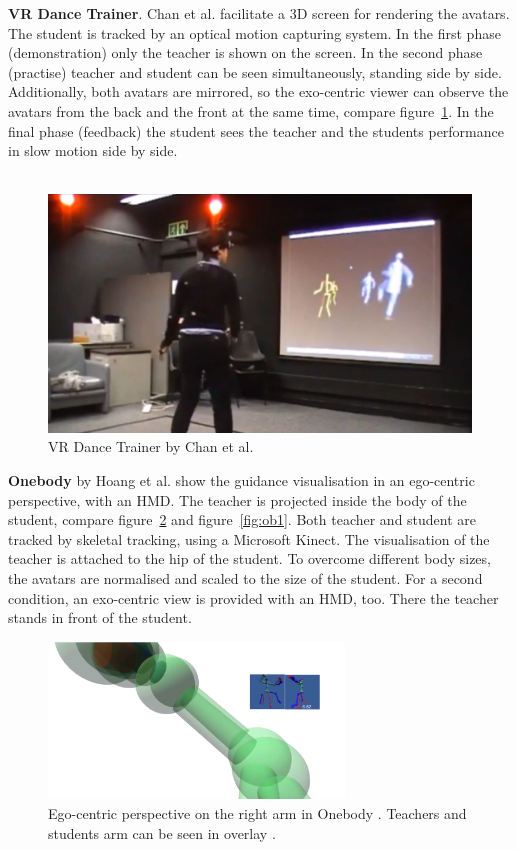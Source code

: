 \textbf{VR Dance Trainer}. Chan et al. \cite{Chan2010} facilitate a 3D screen for rendering the avatars. The student is tracked by an optical motion capturing system. In the first phase (demonstration) only the teacher is shown on the screen. In the second phase (practise) teacher and student can be seen simultaneously, standing side by side. Additionally, both avatars are mirrored, so the exo-centric viewer can observe the avatars from the back and the front at the same time, compare figure~\ref{fig:vrdtPerspectives}. In the final phase (feedback) the student sees the teacher and the students performance in slow motion side by side.\\ \\
\begin{figure}
	\centering
	\includegraphics[width=1.0\textwidth]{img/VRDanceTrainerPerspective.png}
	\caption{VR Dance Trainer by Chan et al. \cite{Chan2010}}
	\label{fig:vrdtPerspectives}
\end{figure}
\textbf{Onebody} by Hoang et al. \cite{Hoang2016} show the guidance visualisation in an ego-centric perspective, with an HMD. The teacher is projected inside the body of the student, compare figure~\ref{fig:obEgoPersp} and figure~\ref{fig:ob1}. Both teacher and student are tracked by skeletal tracking, using a Microsoft Kinect. The visualisation of the teacher is attached to the hip of the student. To overcome different body sizes, the avatars are normalised and scaled to the size of the student. For a second condition, an exo-centric view is provided with an HMD, too. There the teacher stands in front of the student.
\begin{figure}
	\centering
	\includegraphics[width=0.7\textwidth]{img/OneBody_ego_persp.png}
	\caption{Ego-centric perspective on the right arm in Onebody \cite{Hoang2016}. Teachers and students arm can be seen in overlay \cite{Hoang2016}.}
	\label{fig:obEgoPersp}
\end{figure}
